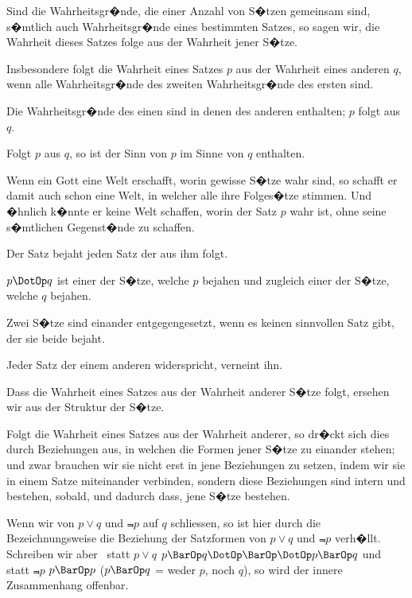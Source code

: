 \begin{propositions}
{Sind die Wahrheitsgr�nde, die einer Anzahl
von S�tzen gemeinsam sind, s�mtlich auch Wahrheitsgr�nde
eines bestimmten Satzes, so sagen
wir, die Wahrheit dieses Satzes folge aus der
Wahrheit jener S�tze.}


{Insbesondere folgt die Wahrheit eines Satzes
\glqq{}$p$\grqq{} aus der Wahrheit eines anderen \glqq{}$q$\grqq{}, wenn
alle Wahrheitsgr�nde des zweiten Wahrheitsgr�nde
des ersten sind.}


{Die Wahrheitsgr�nde des einen sind in denen
des anderen enthalten; $p$ folgt aus $q$.}


{Folgt $p$ aus $q$, so ist der Sinn von \glqq{}$p$\grqq{} im
Sinne von \glqq{}$q$\grqq{} enthalten.}


{Wenn ein Gott eine Welt erschafft, worin
gewisse S�tze wahr sind, so schafft er damit auch
schon eine Welt, in welcher alle ihre Folges�tze
stimmen. Und �hnlich k�nnte er keine Welt
schaffen, worin der Satz \glqq{}$p$\grqq{} wahr ist, ohne seine
s�mtlichen Gegenst�nde zu schaffen.}


{Der Satz bejaht jeden Satz der aus ihm
folgt.}


{\glqq{}$p \DotOp q$\grqq{} ist einer der S�tze, welche \glqq{}$p$\grqq{} bejahen
und zugleich einer der S�tze, welche \glqq{}$q$\grqq{}
bejahen.

Zwei S�tze sind einander entgegengesetzt, wenn
es keinen sinnvollen Satz gibt, der sie beide
bejaht.

Jeder Satz der einem anderen widerspricht,
verneint ihn.}


{Dass die Wahrheit eines Satzes aus der Wahrheit
anderer S�tze folgt, ersehen wir aus der
Struktur der S�tze.}


{Folgt die Wahrheit eines Satzes aus der Wahrheit
anderer, so dr�ckt sich dies durch Beziehungen
aus, in welchen die Formen jener S�tze zu
einander stehen; und zwar brauchen wir sie nicht
erst in jene Beziehungen zu setzen, indem wir
sie in einem Satze miteinander verbinden, sondern
diese Beziehungen sind intern und bestehen, sobald,
und dadurch dass, jene S�tze bestehen.}


{Wenn wir von $p \lor q$ und $\Not{p}$ auf $q$ schliessen,
so ist hier durch die Bezeichnungsweise die Beziehung
der Satzformen von \glqq{}$p \lor q$\grqq{} und \glqq{}$\Not{p}$\grqq{} verh�llt.
Schreiben wir aber \zumBeispiel\ statt \glqq{}$p \lor q$\grqq{}
\glqq{}$p \BarOp q \DotOp \BarOp \DotOp p \BarOp q$\grqq{} und statt \glqq{}$\Not{p}$\grqq{} \glqq{}$p \BarOp p$\grqq{} ($p \BarOp q$ = weder
$p$, noch $q$), so wird der innere Zusammenhang
offenbar.

}
\end{propositions}
